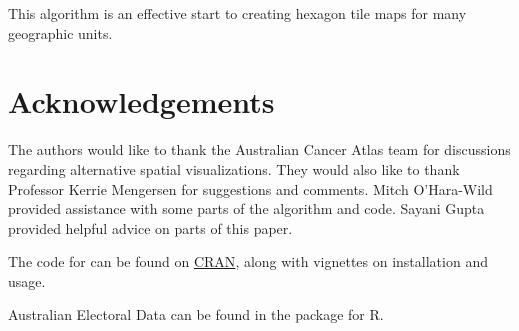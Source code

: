 \documentclass[
]{jss}
\begin{document}
This algorithm is an effective start to creating hexagon tile maps for
many geographic units.

\hypertarget{acknowledgements}{%
\section{Acknowledgements}\label{acknowledgements}}

The authors would like to thank the Australian Cancer Atlas team for
discussions regarding alternative spatial visualizations. They would
also like to thank Professor Kerrie Mengersen for suggestions and
comments. Mitch O'Hara-Wild provided assistance with some parts of the
algorithm and code. Sayani Gupta provided helpful advice on parts of
this paper.

The code for  \citep{sugarbag} can be found on
\href{https://cran.r-project.org/web/packages/sugarbag/index.html}{CRAN},
along with vignettes on installation and usage.

Australian Electoral Data can be found in the  package for
R.


\end{document}
